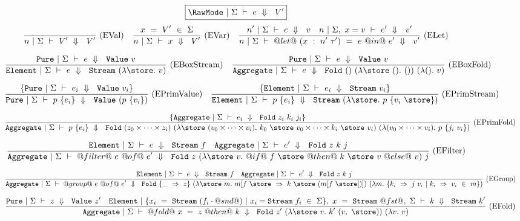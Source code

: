 
\begin{figure*}

$$
\boxed{\SourceStepX{\RawMode}{\Sigma}{e}{V'}}
$$
$$
\enskip \frac {\displaystyle } {\displaystyle 
    n~|~\Sigma~\vdash~V'~\Downarrow~~V'
} \  \mbox{(EVal)} \enskip
\enskip \frac {\displaystyle 
    x~=~V'~\in~\Sigma
} {\displaystyle 
    n~|~\Sigma~\vdash~x~\Downarrow~~V'
} \  \mbox{(EVar)} \enskip
\enskip \frac {\displaystyle 
  n'~|~\Sigma~\vdash~e~\Downarrow~~v
  \quad
  n~|~\Sigma,~x=v~\vdash~e'~\Downarrow~~v'
} {\displaystyle 
  n~|~\Sigma~\vdash~@let@~(x~:~n'~\tau')~=~e~@in@~e'~\Downarrow~~v'
} \  \mbox{(ELet)} \enskip
$$

$$
\ruleIN
{
    \SourceStepXP{\Sigma}{e}{\VValue{v}}
}
{
    \SourceStepXE{\Sigma}{e}{\VStream{(\lam{\store} v)}}
}{EBoxStream}
\ruleIN
{
    \SourceStepXP{\Sigma}{e}{\VValue{v}}
}
{
    \SourceStepXA{\Sigma}{e}{\VFold{()}{(\lam{\store~()} ())}{(\lam{()} v)}}
}{EBoxFold}
$$

$$
\ruleIN
{
  \{ \SourceStepXP{\Sigma}{e_i}{\VValue{v_i}} \}
}
{
  \SourceStepXP
    {\Sigma}
    {p~\{ e_i \} }
    {\VValue{(p~\{v_i\})}}
}{EPrimValue}
\ruleIN
{
  \{ \SourceStepXE{\Sigma}{e_i}{\VStream{v_i}} \}
}
{
  \SourceStepXE
    {\Sigma}
    {p~\{ e_i \} }
    {\VStream{(\lam{\store} p~\{v_i~\store\})}}
}{EPrimStream}
$$

$$
\ruleIN
{
  \{ \SourceStepXA{\Sigma}{e_i}{\VFold{z_i}{k_i}{j_i}} \}
}
{
  \SourceStepXA{\Sigma}
    {p~\{ e_i \} }
    {\VFold
      {(z_0 \times \cdots \times z_i)}
      {(\lam{\store~(v_0 \times \cdots \times v_i)}
        k_0~\store~v_0 \times \cdots \times k_i~\store~v_i)}
      {(\lam{(v_0 \times \cdots \times v_i)}
        p~\{j_i~v_i\})}}
}{EPrimFold}
$$

$$
\ruleIN
{
  \SourceStepXE{\Sigma}{e}{\VStream{f}}
  \quad
  \SourceStepXA{\Sigma}{e'}{\VFold{z}{k}{j}}
}
{
  \SourceStepXA{\Sigma}
    {@filter@~e~@of@~e'}
    {\VFold
      {z}
      {(\lam{\store~v}
         @if@~f~\store~@then@~k~\store~v~@else@~v)}
      {j}}
}{EFilter}
$$

$$
\ruleIN
{
  \SourceStepXE{\Sigma}{e}{\VStream{f}}
  \quad
  \SourceStepXA{\Sigma}{e'}{\VFold{z}{k}{j}}
}
{
  \SourceStepXA{\Sigma}
    {@group@~e~@of@~e'}
    {\VFold
      {\{\_~\Rightarrow~z\}}
      {(\lam{\store~m}
        m[f~\store~\Rightarrow~k~\store~(m[f~\store])])}
      {(\lam{m}
        \{k_i~\Rightarrow~j~v_i~|~k_i~\Rightarrow~v_i~\in~m\})}}
}{EGroup}
$$

$$
\ruleIN
{
  \SourceStepXP{\Sigma}{z}{\VValue{z'}}
  \quad
  \SourceStepXE{\{x_i~=~\VStream{(f_i \cdot @snd@)}~|~x_i=\VStream{f_i}~\in~\Sigma\},~x~=~\VStream{@fst@},~\Sigma}{k}{\VStream{k'}}
}
{
  \SourceStepXA{\Sigma}
    {@fold@~x~=~z~@then@~k}
    {\VFold
      {z'}
      {(\lam{\store~v} k'~(v,~\store))}
      {(\lam{v} v)}}
}{EFold}
$$


\end{figure*}
